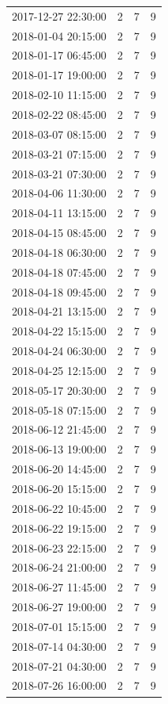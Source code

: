 \begin{tabular}{lrrr}
2017-12-27 22:30:00 & 2 & 7 & 9 \\
2018-01-04 20:15:00 & 2 & 7 & 9 \\
2018-01-17 06:45:00 & 2 & 7 & 9 \\
2018-01-17 19:00:00 & 2 & 7 & 9 \\
2018-02-10 11:15:00 & 2 & 7 & 9 \\
2018-02-22 08:45:00 & 2 & 7 & 9 \\
2018-03-07 08:15:00 & 2 & 7 & 9 \\
2018-03-21 07:15:00 & 2 & 7 & 9 \\
2018-03-21 07:30:00 & 2 & 7 & 9 \\
2018-04-06 11:30:00 & 2 & 7 & 9 \\
2018-04-11 13:15:00 & 2 & 7 & 9 \\
2018-04-15 08:45:00 & 2 & 7 & 9 \\
2018-04-18 06:30:00 & 2 & 7 & 9 \\
2018-04-18 07:45:00 & 2 & 7 & 9 \\
2018-04-18 09:45:00 & 2 & 7 & 9 \\
2018-04-21 13:15:00 & 2 & 7 & 9 \\
2018-04-22 15:15:00 & 2 & 7 & 9 \\
2018-04-24 06:30:00 & 2 & 7 & 9 \\
2018-04-25 12:15:00 & 2 & 7 & 9 \\
2018-05-17 20:30:00 & 2 & 7 & 9 \\
2018-05-18 07:15:00 & 2 & 7 & 9 \\
2018-06-12 21:45:00 & 2 & 7 & 9 \\
2018-06-13 19:00:00 & 2 & 7 & 9 \\
2018-06-20 14:45:00 & 2 & 7 & 9 \\
2018-06-20 15:15:00 & 2 & 7 & 9 \\
2018-06-22 10:45:00 & 2 & 7 & 9 \\
2018-06-22 19:15:00 & 2 & 7 & 9 \\
2018-06-23 22:15:00 & 2 & 7 & 9 \\
2018-06-24 21:00:00 & 2 & 7 & 9 \\
2018-06-27 11:45:00 & 2 & 7 & 9 \\
2018-06-27 19:00:00 & 2 & 7 & 9 \\
2018-07-01 15:15:00 & 2 & 7 & 9 \\
2018-07-14 04:30:00 & 2 & 7 & 9 \\
2018-07-21 04:30:00 & 2 & 7 & 9 \\
2018-07-26 16:00:00 & 2 & 7 & 9 \\

\end{tabular}
